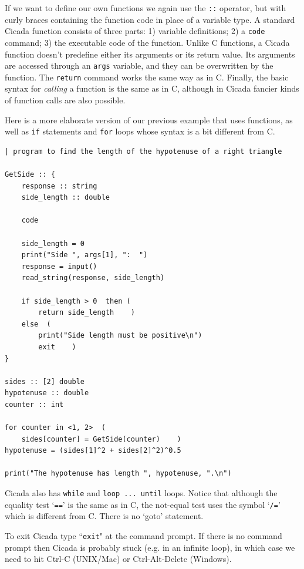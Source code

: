 \documentclass{article}
\newenvironment{code}{
       \begin{list}{}{
               \setlength{\leftmargin}{.4in}
               \setlength{\rightmargin}{0in}
               \setlength{\topsep}{.2in}
       }
       \small
       \item[] }
       { \end{list}   }
\begin{document}
If we want to define our own functions we again use the \verb#::# operator, but with curly braces containing the function code in place of a variable type.  A standard Cicada function consists of three parts:  1) variable definitions; 2) a \verb#code# command; 3) the executable code of the function.  Unlike C functions, a Cicada function doesn't predefine either its arguments or its return value.  Its arguments are accessed through an \verb#args# variable, and they can be overwritten by the function.  The \verb#return# command works the same way as in C.  Finally, the basic syntax for \emph{calling} a function is the same as in C, although in Cicada fancier kinds of function calls are also possible.

Here is a more elaborate version of our previous example that uses functions, as well as \verb#if# statements and \verb#for# loops whose syntax is a bit different from C.

\begin{code} \begin{verbatim}
| program to find the length of the hypotenuse of a right triangle

GetSide :: {
    response :: string
    side_length :: double
    
    code
    
    side_length = 0
    print("Side ", args[1], ":  ")
    response = input()
    read_string(response, side_length)
    
    if side_length > 0  then (
        return side_length    )
    else  (
        print("Side length must be positive\n")
        exit    )
}

sides :: [2] double
hypotenuse :: double
counter :: int

for counter in <1, 2>  (
    sides[counter] = GetSide(counter)    )
hypotenuse = (sides[1]^2 + sides[2]^2)^0.5

print("The hypotenuse has length ", hypotenuse, ".\n")
\end{verbatim} \end{code}

Cicada also has \texttt{while} and \verb#loop ... until# loops.  Notice that although the equality test `\verb#==#' is the same as in C, the not-equal test uses the symbol `\verb#/=#' which is different from C.  There is no `goto' statement.

To exit Cicada type ``\texttt{exit}" at the command prompt.  If there is no command prompt then Cicada is probably stuck (e.g. in an infinite loop), in which case we need to hit Ctrl-C (UNIX/Mac) or Ctrl-Alt-Delete (Windows).
\end{document}
